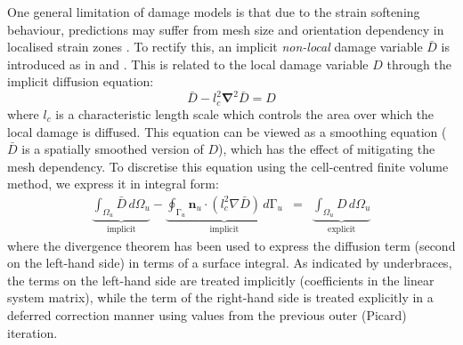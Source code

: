 \documentclass[sn-mathphys,Numbered]{sn-jnl}%
\newcommand{\bb}{\boldsymbol}
\begin{document}
One general limitation of damage models is that due to the strain softening behaviour, predictions may suffer from mesh size and orientation dependency in localised strain zones \cite{peerlings_critical_2001, peerlings_localisation_2002, geers_strongly_2003}.
To rectify this, an implicit \emph{non-local} damage variable $\bar{D}$ is introduced as in \citet{peerlings_critical_2001, peerlings_localisation_2002} and \citet{geers_strongly_2003}.
This is related to the local damage variable $D$ through the implicit diffusion equation:
\begin{equation} \label{eqn:nonLocalEquation}
	\bar{D} -  l_c^2 \bb{\nabla}^2 \bar{D} = D
\end{equation}
where $l_c$ is a characteristic length scale which controls the area over which the local damage is diffused.
This equation can be viewed as a smoothing equation ($\bar{D}$ is a spatially smoothed version of $D$), which has the effect of mitigating the mesh dependency.
To discretise this equation using the cell-centred finite volume method, we express it in integral form:
\begin{eqnarray} \label{eqn:nonLocalEquationIntegral}
	\underbrace{ \int_{\Omega_u} \bar{D} \, d \Omega_u }_{\text {implicit}}
	- \underbrace{  \oint_{\mathrm{\Gamma}_u}  \bb{n}_u \cdot \left( l_c^2 \nabla \bar{D} \right) \,  d\mathrm{\Gamma}_u }_{\text {implicit}}
	 &=&  \underbrace{ \int_{\Omega_u} D \, d \Omega_u }_{\text {explicit}}
\end{eqnarray}
where the divergence theorem has been used to express the diffusion term (second on the left-hand side) in terms of a surface integral.
As indicated by underbraces, the terms on the left-hand side are treated implicitly (coefficients in the linear system matrix), while the term of the right-hand side is treated explicitly in a deferred correction manner using values from the previous outer (Picard) iteration.
\end{document}
